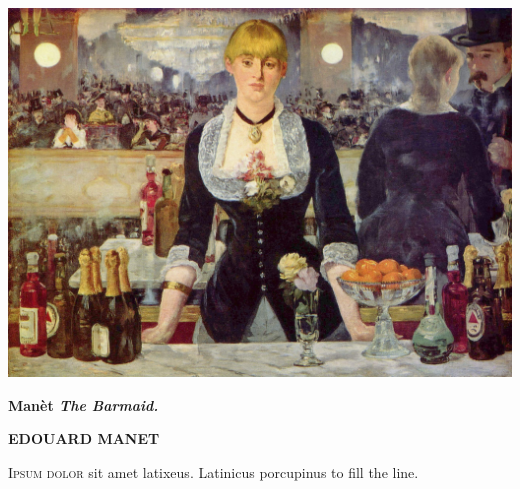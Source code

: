 \documentclass[royal]{octavo}
\begin{document}
   \hskip-0.9cm\includegraphics[width=1.1\textwidth]{manet}\par
    \par\hfill\hfill{\tiny\bfseries Man\`et  \textit{The Barmaid.}}\\
    \par
    \vspace*{\baselineskip}
    \par
    \begin{center}
    \noindent\large\bfseries EDOUARD MANET
    \end{center}
    \begin{multicols}{3}
      \lettrine[lines=2]{I}{psum dolor} sit amet latixeus. \lipsum*[1-2]
      Latinicus porcupinus to fill the line.
    \end{multicols}
\clearpage
\end{document}

